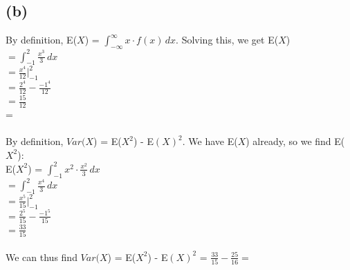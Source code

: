 \documentclass{article}
\begin{document}
{\subsection*{(b)}
By definition, E($X$) = $\int_{-\infty}^{\infty}x \cdot f(x) \,dx$. Solving this, we get E($X$)  \\ 
$ = \int_{-1}^{2} \frac{x^3}{3} \,dx$ \\ 
$ = \frac{x^4}{12} |_{-1}^{2}$ \\ 
$ = \frac{2^4}{12} - \frac{-1^4}{12}$ \\ 
$ = \frac{15}{12}$ \\
=  \\ \\
By definition, $Var(X$) = E($X^2$) - E$(X)^2$. We have E($X$) already, so we find E($X^2$): \\ 
E($X^2$) = $ \int_{-1}^{2} x^2 \cdot \frac{x^2}{3} \,dx$ \\ 
$ = \int_{-1}^{2} \frac{x^4}{3} \,dx$ \\
$ = \frac{x^5}{15} |_{-1}^{2}$ \\
$ = \frac{2^5}{15} - \frac{-1^5}{15}$ \\
$ = \frac{33}{15}$ \\ \\ 
We can thus find $Var(X$) = E($X^2$) - E$(X)^2$ = $\frac{33}{15} - \frac{25}{16} = $  

}
\end{document}
